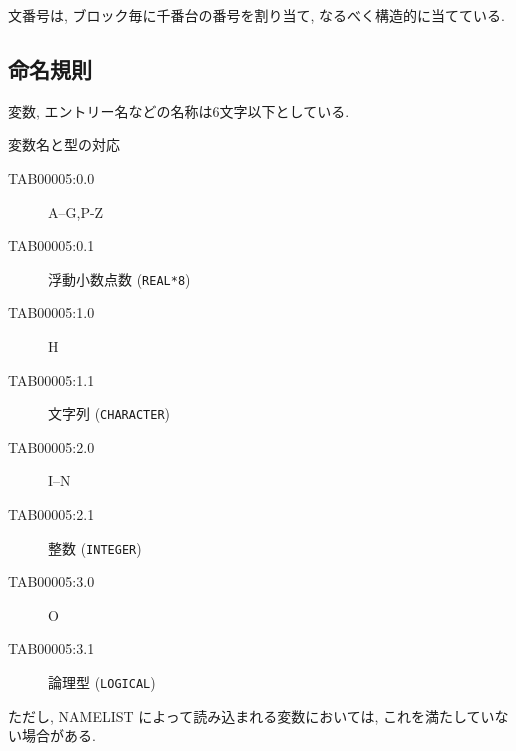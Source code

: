 \・文番号は, ブロック毎に千番台の番号を割り当て,
  なるべく構造的に当てている.

\subsection{命名規則}

\・変数, エントリー名などの名称は6文字以下としている.

\・変数名と型の対応 
\begin{center}
\begin{description}
\item[TAB00005:0.0] A--G,P-Z
\item[TAB00005:0.1] 浮動小数点数 ({\tt REAL*8})
\item[TAB00005:1.0] H
\item[TAB00005:1.1] 文字列 ({\tt CHARACTER})
\item[TAB00005:2.0] I--N
\item[TAB00005:2.1] 整数   ({\tt INTEGER})
\item[TAB00005:3.0] O
\item[TAB00005:3.1] 論理型 ({\tt LOGICAL})
\end{description}
\end{center}
ただし, NAMELIST によって読み込まれる変数においては, 
これを満たしていない場合がある.

